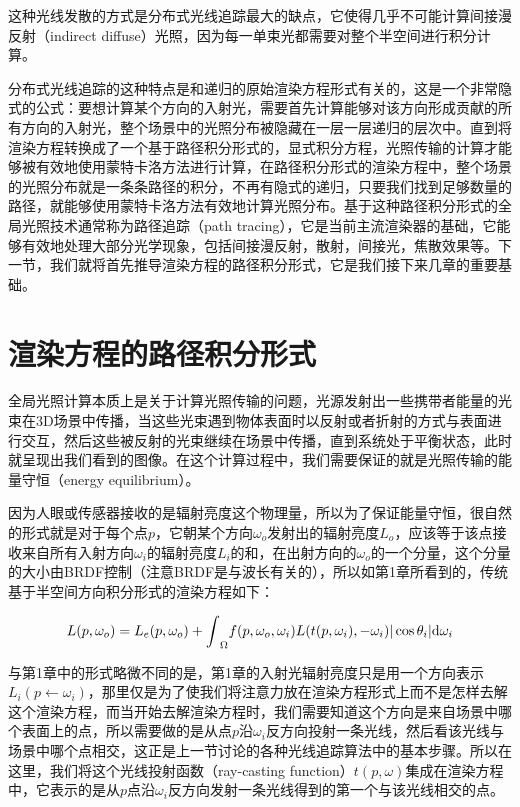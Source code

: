这种光线发散的方式是分布式光线追踪最大的缺点，它使得几乎不可能计算间接漫反射（indirect diffuse）光照，因为每一单束光都需要对整个半空间进行积分计算。

分布式光线追踪的这种特点是和递归的原始渲染方程形式有关的，这是一个非常隐式的公式：要想计算某个方向的入射光，需要首先计算能够对该方向形成贡献的所有方向的入射光，整个场景中的光照分布被隐藏在一层一层递归的层次中。直到\cite{a:TheRenderingEquation}将渲染方程转换成了一个基于路径积分形式的，显式积分方程，光照传输的计算才能够被有效地使用蒙特卡洛方法进行计算，在路径积分形式的渲染方程中，整个场景的光照分布就是一条条路径的积分，不再有隐式的递归，只要我们找到足够数量的路径，就能够使用蒙特卡洛方法有效地计算光照分布。基于这种路径积分形式的全局光照技术通常称为路径追踪（path tracing），它是当前主流渲染器的基础，它能够有效地处理大部分光学现象，包括间接漫反射，散射，间接光，焦散效果等。下一节，我们就将首先推导渲染方程的路径积分形式，它是我们接下来几章的重要基础。






\section{渲染方程的路径积分形式}\label{sec:pt-surface-form}
全局光照计算本质上是关于计算光照传输的问题，光源发射出一些携带者能量的光束在3D场景中传播，当这些光束遇到物体表面时以反射或者折射的方式与表面进行交互，然后这些被反射的光束继续在场景中传播，直到系统处于平衡状态，此时就呈现出我们看到的图像。在这个计算过程中，我们需要保证的就是光照传输的能量守恒（energy equilibrium）。

因为人眼或传感器接收的是辐射亮度这个物理量，所以为了保证能量守恒，很自然的形式就是对于每个点$p$，它朝某个方向$\omega_o$发射出的辐射亮度$L_o$，应该等于该点接收来自所有入射方向$\omega_i$的辐射亮度$L_i$的和，在出射方向的$\omega_o$的一个分量，这个分量的大小由BRDF控制（注意BRDF是与波长有关的），所以如第1章所看到的，传统基于半空间方向积分形式的渲染方程如下：

\begin{equation}\label{e:hemisphere-formulation}
	L(p,\omega_o)=L_e(p,\omega_o)+{\rm \int}_{\Omega}f(p,\omega_o,\omega_i)L(t(p,\omega_i),-\omega_i)|\cos\theta_i|{\rm d}\omega_i
\end{equation}

与第1章中的形式略微不同的是，第1章的入射光辐射亮度只是用一个方向表示$L_i(p\leftarrow\omega_i)$，那里仅是为了使我们将注意力放在渲染方程形式上而不是怎样去解这个渲染方程，而当开始去解渲染方程时，我们需要知道这个方向是来自场景中哪个表面上的点，所以需要做的是从点$p$沿$\omega_i$反方向投射一条光线，然后看该光线与场景中哪个点相交，这正是上一节讨论的各种光线追踪算法中的基本步骤。所以在这里，我们将这个光线投射函数（ray-casting function）$t(p,\omega)$集成在渲染方程中，它表示的是从$p$点沿$\omega_i$反方向发射一条光线得到的第一个与该光线相交的点。

